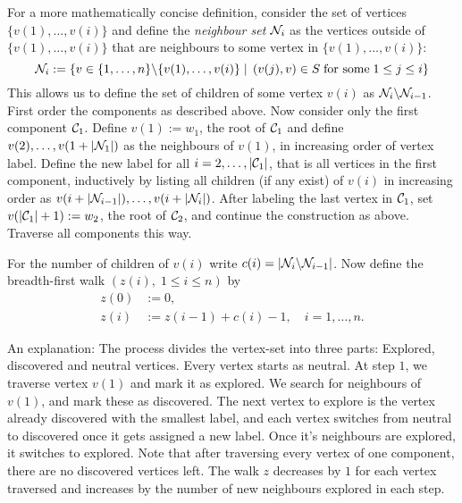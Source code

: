 For a more mathematically concise definition,
consider the set of vertices $\{ v(1),\dots, v(i) \}$
and define the \emph{neighbour set} $\mathcal{N}_{i}$ as the vertices outside of
$\{ v(1),\dots, v(i) \}$ 
that are neighbours to some vertex in 
$\{ v(1),\dots, v(i) \}$:
\begin{equation}
\mathcal{N}_{i} := 
\left\lbrace v \in \{1, \dots, n\} \backslash \{ v(1),\dots, v(i) \} 
\; | \; 
\left(v(j), v\right) \in S \; \text{for some} \; 1 \leq j \leq i \right\rbrace
\end{equation}
This allows us to define the set of children of some vertex $v(i)$ as
$\mathcal{N}_{i} \backslash \mathcal{N}_{i-1}$.
First order the components as described above. 
Now consider only the first component $\mathcal{C}_{1}$.
Define $v(1) := w_1$, the root of $\mathcal{C}_{1}$ and define
$v(2), \dots , v(1 + |\mathcal{N}_{1}|)$ 
as the neighbours of $v(1)$,
in increasing order of vertex label. 
Define the new label for all 
$i = 2, \dots, |\mathcal{C}_{1}|$,
that is all vertices in the first component,
inductively by listing all children (if any exist) of $v(i)$
in increasing order as 
$ v(i + |\mathcal{N}_{i-1}|), \dots, v(i + |\mathcal{N}_{i}|) $.
After labeling the last vertex in $\mathcal{C}_{1}$, set
$v(|\mathcal{C}_{1}| + 1) := w_2$, 
the root of $\mathcal{C}_{2}$, and continue the construction as above.
Traverse all components this way.


For the number of children of $v(i)$ write 
$c(i) = |\mathcal{N}_{i} \backslash\mathcal{N}_{i-1}|$.
Now define the breadth-first walk 
$(z(i), \; 1 \leq i \leq n)$
by
\begin{equation} \label{E: def bf-walk z}
\begin{aligned}
z(0) &:= 0, \\
z(i) &:= z(i-1) + c(i) -1, \quad i=1, \dots , n.
\end{aligned}
\end{equation}


An explanation:
The process divides the vertex-set into three parts: 
Explored, discovered and neutral vertices. Every vertex starts as neutral.
At step $1$, we traverse vertex $v(1)$ and mark it as explored.
We search for neighbours of $v(1)$, and mark these as discovered.
The next vertex to explore is the vertex already discovered with the smallest label,
and each vertex switches from neutral to discovered once it gets assigned a new label.
Once it's neighbours are explored, it switches to explored.
Note that after traversing every vertex of one component, 
there are no discovered vertices left.
The walk $z$ decreases by $1$ for each vertex traversed
and increases by the number of new neighbours explored in each step.


